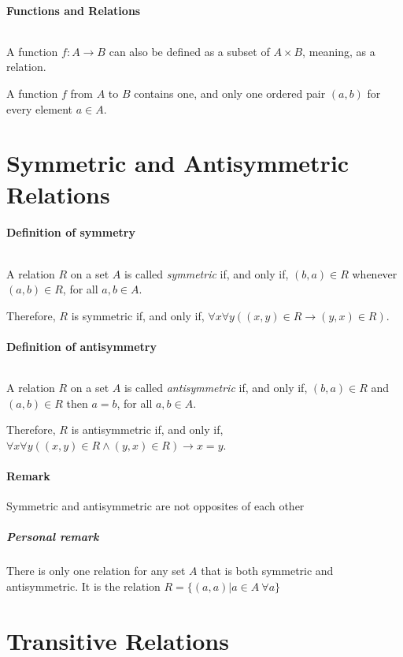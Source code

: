 \documentclass[10pt,a4paper]{book}
\begin{document}
\paragraph*{Functions and Relations}
$\ $\par 
A function $f:A \to B$ can also be defined as a subset of $A \times B$, meaning, as a relation.\par
A function $f$ from $A$ to $B$ contains one, and only one ordered pair $(a,b)$ for every element $a \in A$.

\section{Symmetric and Antisymmetric Relations}

\paragraph*{Definition of symmetry}
$\ $\par 
A relation $R$ on a set $A$ is called \textit{symmetric} if, and only if, $(b,a) \in R$ whenever $(a,b) \in R$, for all $a,b \in A$.\par
Therefore, $R$ is symmetric if, and only if, $\forall x \forall y ((x,y) \in R \to (y,x) \in R)$.

\paragraph*{Definition of antisymmetry}
$\ $\par
A relation $R$ on a set $A$ is called \textit{antisymmetric} if, and only if, $(b,a) \in R$ and $(a,b) \in R$ then $a = b$, for all $a,b \in A$.\par
Therefore, $R$ is antisymmetric if, and only if, $\forall x \forall y ((x,y) \in R \land (y,x) \in R) \to x = y$.

\paragraph*{Remark}
Symmetric and antisymmetric are not opposites of each other
 
\subparagraph*{Personal remark}
There is only one relation for any set $A$ that is both symmetric and antisymmetric. It is the relation $R = \{(a,a)|a \in A \ \forall a\}$

\section{Transitive Relations}
\end{document}
